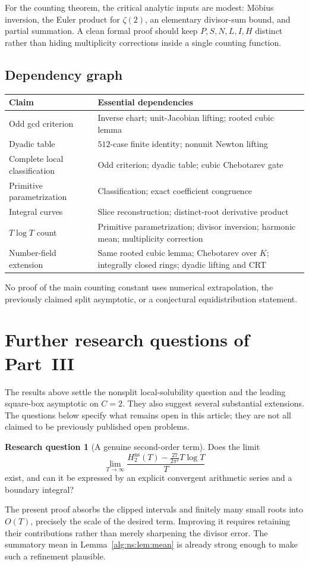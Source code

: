 \documentclass[11pt]{article}
\numberwithin{equation}{section}
\theoremstyle{plain}
\theoremstyle{plain}
\theoremstyle{plain}
\theoremstyle{definition}
\theoremstyle{definition}
\newtheorem{question}[question]{Research question}
\theoremstyle{definition}
\theoremstyle{remark}
\newcommand{\NS}{\mathrm{ns}}\newcommand{\spc}{\mathrm{sp}}
\begin{document}
For the counting theorem, the critical analytic inputs are modest:
M\"obius inversion, the Euler product for $\zeta(2)$, an elementary
divisor-sum bound, and partial summation. A clean formal proof should
keep $P,S,N,L,I,H$ distinct rather than hiding multiplicity corrections
inside a single counting function.

\subsection{Dependency graph}
\begin{center}\small
\begin{tabular}{@{}p{}p{}@{}}
\toprule
Claim & Essential dependencies\\
\midrule
Odd gcd criterion & Inverse chart; unit-Jacobian lifting; rooted cubic lemma\\
Dyadic table & $512$-case finite identity; nonunit Newton lifting\\
Complete local classification & Odd criterion; dyadic table; cubic Chebotarev gate\\
Primitive parametrization & Classification; exact coefficient congruence\\
Integral curves & Slice reconstruction; distinct-root derivative product\\
$T\log T$ count & Primitive parametrization; divisor inversion; harmonic mean;
 multiplicity correction\\
Number-field extension & Same rooted cubic lemma; Chebotarev over $K$;
 integrally closed rings; dyadic lifting and CRT\\
\bottomrule
\end{tabular}
\end{center}
No proof of the main counting constant uses numerical extrapolation,
the previously claimed split asymptotic, or a conjectural equidistribution
statement.

\section{Further research questions of Part~III}\label{alg:ns:sec:questions}
The results above settle the nonsplit local-solubility question and the
leading square-box asymptotic on $C=2$. They also suggest several
substantial extensions. The questions below specify what remains open
in this article; they are not all claimed to be previously published
open problems.

\begin{question}[A genuine second-order term]\label{alg:ns:q:second}
Does the limit
\[
\lim_{T\to\infty}\frac{H_2^{\NS}(T)-\frac{27}{2\pi^2}T\log T}{T}
\]
exist, and can it be expressed by an explicit convergent arithmetic
series and a boundary integral?
\end{question}
The present proof absorbs the clipped intervals and finitely many small
roots into $O(T)$, precisely the scale of the desired term. Improving it
requires retaining their contributions rather than merely sharpening
the divisor error. The summatory mean in Lemma~\ref{alg:ns:lem:mean} is already
strong enough to make such a refinement plausible.
\end{document}
